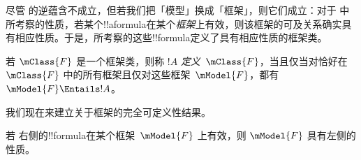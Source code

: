 \documentclass[../../../include/open-logic-section]{subfiles}
\begin{document}


尽管  的逆蕴含不成立，但若我们把「模型」换成「框架」，则它们成立：对于  中所考察的性质，若某个!!a{formula}在某个\emph{框架}上有效，则该框架的可及关系确实具有相应性质。于是，所考察的这些!!{formula}定义了具有相应性质的框架类。

\begin{defn}
  若 $\mClass{F}$ 是一个框架类，则称 $!A$ \emph{定义}~$\mClass{F}$，当且仅当对恰好在 $\mClass{F}$ 中的所有框架且仅对这些框架~$\mModel{F}$，都有 $\mModel{F} \Entails !A$。
\end{defn}

我们现在来建立关于框架的完全可定义性结果。

\begin{thm}
若  右侧的!!{formula}在某个框架~$\mModel{F}$ 上有效，则 $\mModel{F}$ 具有左侧的性质。
\end{thm}
\end{document}
